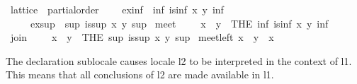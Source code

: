 \begin{isabellebody}
\isanewline
{}\isamarkupfalse%
\ lattice\ {\isacharequal}{\kern0pt}\ partial{\isacharunderscore}{\kern0pt}order\ {\isacharplus}{\kern0pt}\isanewline
\ \ \ ex{\isacharunderscore}{\kern0pt}inf{\isacharcolon}{\kern0pt}\ {\isachardoublequoteopen}{\isasymexists}\ inf{\isachardot}{\kern0pt}\ is{\isacharunderscore}{\kern0pt}inf\ x\ y\ inf{\isachardoublequoteclose}\isanewline
\ \ \ \ \ ex{\isacharunderscore}{\kern0pt}sup{\isacharcolon}{\kern0pt}\ {\isachardoublequoteopen}{\isasymexists}\ sup{\isachardot}{\kern0pt}\ is{\isacharunderscore}{\kern0pt}sup\ x\ y\ sup{\isachardoublequoteclose}\isanewline
{}\isanewline
\isanewline
{}\isamarkupfalse%
\ meet\ {\isacharparenleft}{\kern0pt}\ {\isachardoublequoteopen}{\isasymsqinter}{\isachardoublequoteclose}\ {}{}{\isacharparenright}{\kern0pt}\ \ {\isachardoublequoteopen}x\ {\isasymsqinter}\ y\ {\isacharequal}{\kern0pt}\ {\isacharparenleft}{\kern0pt}THE\ inf{\isachardot}{\kern0pt}\ is{\isacharunderscore}{\kern0pt}inf\ x\ y\ inf{\isacharparenright}{\kern0pt}{\isachardoublequoteclose}\isanewline
{}\isamarkupfalse%
\ join\ {\isacharparenleft}{\kern0pt}\ {\isachardoublequoteopen}{\isasymsqunion}{\isachardoublequoteclose}\ {}{}{\isacharparenright}{\kern0pt}\ \ {\isachardoublequoteopen}x\ {\isasymsqunion}\ y\ {\isacharequal}{\kern0pt}\ {\isacharparenleft}{\kern0pt}THE\ sup{\isachardot}{\kern0pt}\ is{\isacharunderscore}{\kern0pt}sup\ x\ y\ sup{\isacharparenright}{\kern0pt}{\isachardoublequoteclose}\isanewline
\isanewline
{}\isamarkupfalse%
\ meet{\isacharunderscore}{\kern0pt}left{\isacharcolon}{\kern0pt}\ {\isachardoublequoteopen}x\ {\isasymsqinter}\ y\ {\isasymsqsubseteq}\ x{\isachardoublequoteclose}%
\isadelimproof
\ %
\endisadelimproof
%
\isatagproof
{}\isamarkupfalse%
%
\endisatagproof
{\isafoldproof}%
%
\isadelimproof
%
\endisadelimproof
\isanewline
\isanewline
{}\isamarkupfalse%
%
\isadelimdocument
%
\endisadelimdocument
%
\isatagdocument
%
\isamarkuptrue%
%
\endisatagdocument
{\isafolddocument}%
%
\isadelimdocument
%
\endisadelimdocument
%
\begin{isamarkuptext}%
The declaration sublocale  causes locale l2 to be interpreted in the context of l1. 
This means that all conclusions of l2 are made available in l1.%
\end{isamarkuptext}\isamarkuptrue%

\end{isabellebody}

